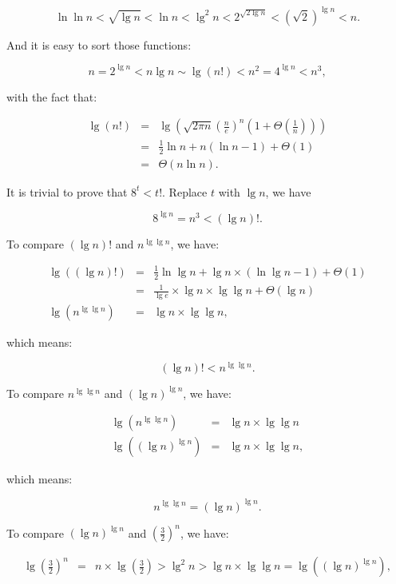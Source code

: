 \begin{description}
\begin{equation}
\ln \ln n  < \sqrt{\lg n} < \ln n < \lg^2 n < 2^{\sqrt{2\lg n}} < \left(\sqrt{2}\right)^{\lg n}  < n.
\end{equation}

And it is easy to sort those functions:

\begin{equation}
n = 2^{\lg n} < n \lg n \sim \lg\left(n !\right) < n^2 = 4^{\lg n} < n^3,
\end{equation}

with the fact that:

\begin{eqnarray*}
\lg (n!) &=& \lg \left(\sqrt{2\pi n} \left(\frac{n}{e}\right)^n\left(1 + \Theta\left(\frac{1}{n}\right)\right)\right)\\
&=& \frac{1}{2}\ln n + n(\ln n - 1) + \Theta(1)\\
&=& \Theta(n \ln n).
\end{eqnarray*}

It is trivial to prove that $8^t < t!$. Replace $t$ with $\lg n$, we have

$$8^{\lg n} = n^3 < (\lg n)!.$$

To compare $(\lg n)!$ and $n^{\lg \lg n}$,  we have:

\begin{eqnarray*}
\lg \left((\lg n)! \right) &=& \frac{1}{2} \ln \lg n + \lg n \times (\ln \lg n - 1) + \Theta(1)\\
&=& \frac{1}{\lg e}\times \lg n \times \lg \lg n + \Theta(\lg n)\\
\lg \left(n^{\lg \lg n}\right) &=& \lg n \times \lg \lg n,
\end{eqnarray*}

which means:

$$(\lg n)! < n^{\lg \lg n}.$$

To compare $ n^{\lg \lg n}$ and $(\lg n)^{\lg n}$, we have:

\begin{eqnarray*}
\lg \left(n ^ {\lg \lg n}\right) &=& \lg n \times \lg \lg n\\
\lg \left(\left(\lg n\right)^{\lg n}\right) &=& \lg n \times \lg \lg n,
\end{eqnarray*}

which means:

$$ n^{\lg \lg n}  = (\lg n)^{\lg n}.$$

To compare $(\lg n)^{\lg n}$ and $\left(\frac{3}{2}\right)^n$, we have:

\begin{eqnarray*}
\lg \left( \frac{3}{2}\right)^n &=& n\times \lg \left(\frac{3}{2}\right) > \lg^2 n > \lg n\times \lg \lg n = \lg \left(\left(\lg n\right)^{\lg n}\right),
\end{eqnarray*}


\end{description}
